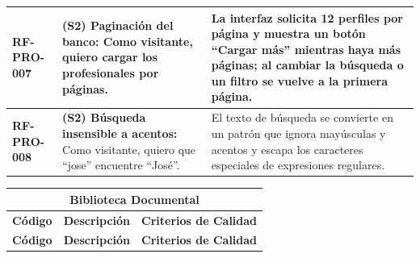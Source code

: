 \begin{longtable}{|l||p{7cm}|p{4.5cm}|}
\hline
\textbf{RF-PRO-007} & \textbf{(S2) Paginación del banco:} Como visitante, quiero cargar los profesionales por páginas. & La interfaz solicita 12 perfiles por página y muestra un botón ``Cargar más'' mientras haya más páginas; al cambiar la búsqueda o un filtro se vuelve a la primera página. \\
\hline
\textbf{RF-PRO-008} & \textbf{(S2) Búsqueda insensible a acentos:} Como visitante, quiero que ``jose'' encuentre ``José''. & El texto de búsqueda se convierte en un patrón que ignora mayúsculas y acentos y escapa los caracteres especiales de expresiones regulares. \\
\hline
\end{longtable}

\begin{longtable}{|l||p{7cm}|p{4.5cm}|}

\multicolumn{3}{c}{Biblioteca Documental}\\
\hline\hline
\textbf{Código} & \textbf{Descripción} & \textbf{Criterios de Calidad}\\
\hline
\endfirsthead
\textbf{Código} & \textbf{Descripción} & \textbf{Criterios de Calidad}\\
\hline\hline
\endhead


\end{longtable}
